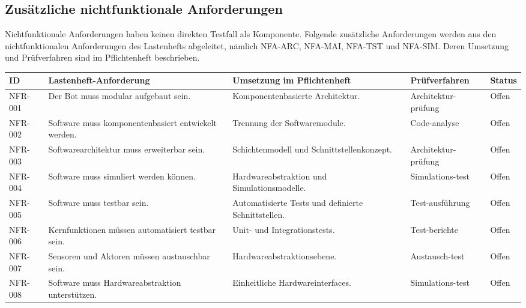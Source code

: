 \documentclass[
  a4paper,
  12pt,
  DIV=12,        %
  parskip=half,  %
  headings=small %
]{scrartcl}
\theoremstyle{definition}
\theoremstyle{definition}
\begin{document}
\subsection{Zusätzliche nichtfunktionale
Anforderungen}\label{zusuxe4tzliche-nichtfunktionale-anforderungen}

Nichtfunktionale Anforderungen haben keinen direkten Testfall als
Komponente. Folgende zusätzliche Anforderungen werden aus den
nichtfunktionalen Anforderungen des Lastenhefts abgeleitet, nämlich
NFA-ARC, NFA-MAI, NFA-TST und NFA-SIM. Deren Umsetzung und Prüfverfahren
sind im Pflichtenheft beschrieben.

\begin{longtable}[]{@{}
  >{\raggedright\arraybackslash}p{}
  >{\raggedright\arraybackslash}p{}
  >{\raggedright\arraybackslash}p{}
  >{\raggedright\arraybackslash}p{}
  >{\raggedleft\arraybackslash}p{}@{}}
\toprule\noalign{}
\begin{minipage}[b]{\linewidth}\raggedright
ID
\end{minipage} & \begin{minipage}[b]{\linewidth}\raggedright
Lastenheft-Anforderung
\end{minipage} & \begin{minipage}[b]{\linewidth}\raggedright
Umsetzung im Pflichtenheft
\end{minipage} & \begin{minipage}[b]{\linewidth}\raggedright
Prüfverfahren
\end{minipage} & \begin{minipage}[b]{\linewidth}\raggedleft
Status
\end{minipage} \\
\midrule\noalign{}
\endhead
\bottomrule\noalign{}
\endlastfoot
NFR-001 & Der Bot muss modular aufgebaut sein. & Komponentenbasierte
Architektur. & Architektur-prüfung & Offen \\
NFR-002 & Software muss komponentenbasiert entwickelt werden. & Trennung
der Softwaremodule. & Code-analyse & Offen \\
NFR-003 & Softwarearchitektur muss erweiterbar sein. & Schichtenmodell
und Schnittstellenkonzept. & Architektur-prüfung & Offen \\
NFR-004 & Software muss simuliert werden können. & Hardwareabstraktion
und Simulationsmodelle. & Simulations-test & Offen \\
NFR-005 & Software muss testbar sein. & Automatisierte Tests und
definierte Schnittstellen. & Test-ausführung & Offen \\
NFR-006 & Kernfunktionen müssen automatisiert testbar sein. & Unit- und
Integrationstests. & Test-berichte & Offen \\
NFR-007 & Sensoren und Aktoren müssen austauschbar sein. &
Hardwareabstraktionsebene. & Austausch-test & Offen \\
NFR-008 & Software muss Hardwareabstraktion unterstützen. & Einheitliche
Hardwareinterfaces. & Simulations-test & Offen \\
\end{longtable}
\end{document}
